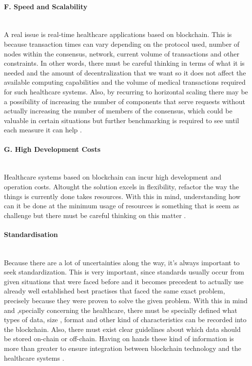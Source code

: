 \paragraph{F. Speed and Scalability} \mbox{}\\
A real issue is real-time healthcare applications based on blockchain. This is because transaction times can vary 
depending on the protocol used, number of nodes within the consensus, network, current volume of transactions and 
other constraints. In other words, there must be careful thinking in terms of what it is needed and the amount of 
decentralization that we want so it does not affect the available computing capabilities and the volume of medical 
transactions required for such healthcare systems. Also, by recurring to horizontal scaling there may be a possibility 
of increasing the number of components that serve requests without actually increasing the number of members of the consensus, 
which could be valuable in certain situations but further benchmarking is required to see until each measure it 
can help \cite{ethereum-scaling}.

\paragraph{G. High Development Costs} \mbox{}\\
Healthcare systems based on blockchain can incur high development and operation costs. Altought the solution excels in 
flexibility, refactor the way the things is currently done takes resources. With this in mind, understanding how can it 
be done at the minimum usage of resources is something that is seem as challenge but there must be careful thinking on this 
matter \cite{hyperledger-cost}.

\paragraph{Standardisation} \mbox{}\\
Because there are a lot of uncertainties along the way, it's always important to seek standardization. This is very 
important, since standards usually occur from given situations that were faced before and it becomes precedent to 
actually use already well established best practises that faced the same exact problem, precisely because they were 
proven to solve the given problem. With this in mind and ,specially concerning the healthcare, there must be specially 
defined what types of data, size , format and other kind of characteristics can be recorded into the blockchain. Also, there 
must exist clear guidelines about  which data should be stored on-chain or off-chain. Having on hands these kind of information is 
more than greater to ensure integration between blockchain technology and the healthcare systems \cite{blockchain-standards}.

